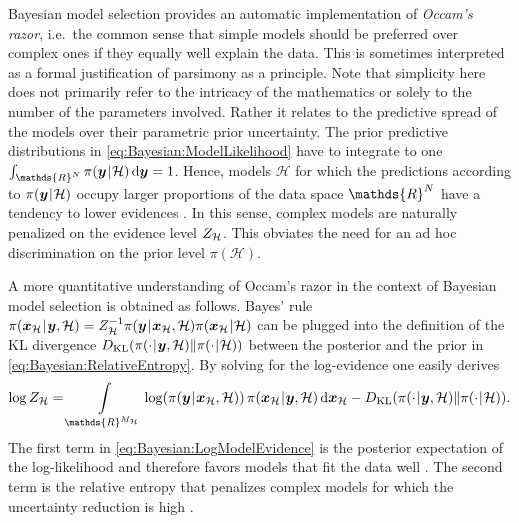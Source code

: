 \par %
Bayesian model selection provides an automatic implementation of \emph{Occam's razor},
i.e.\ the common sense that simple models should be preferred over complex ones if they equally well explain the data.
This is sometimes interpreted as a formal justification of parsimony as a principle.
Note that simplicity here does not primarily refer to the intricacy of the mathematics or solely to the number of the parameters involved.
Rather it relates to the predictive spread of the models over their parametric prior uncertainty.
The prior predictive distributions in \cref{eq:Bayesian:ModelLikelihood} have to integrate to one \(\int_{\mathds{R}^\dimData} \pi(\bm{y} \cond \mathcal{H}) \, \mathrm{d} \bm{y} = 1\).
Hence, models \(\mathcal{H}\) for which the predictions according to \(\pi(\bm{y} {\:\!}|{\:\!} \mathcal{H})\) occupy larger proportions of the data space \(\mathds{R}^\dimData\)
have a tendency to lower evidences \cite{Bayesian:MacKay1992,Bayesian:MacKay1995}.
In this sense, complex models are naturally penalized on the evidence level \(Z_\mathcal{H}\).
This obviates the need for an ad hoc discrimination on the prior level \(\pi(\mathcal{H})\).
\par %
A more quantitative understanding of Occam's razor in the context of Bayesian model selection is obtained as follows.
Bayes' rule \(\pi(\bm{x}_\mathcal{H} {\:\!}|{\:\!} \bm{y},\mathcal{H}) = Z_\mathcal{H}^{-1} \pi(\bm{y} {\:\!}|{\:\!} \bm{x}_\mathcal{H},\mathcal{H}) \pi(\bm{x}_\mathcal{H} {\:\!}|{\:\!} \mathcal{H})\)
can be plugged into the definition of the KL divergence \(D_{\mathrm{KL}}(\pi(\cdot {\:\!}|{\:\!} \bm{y},\mathcal{H}) \| \pi(\cdot {\:\!}|{\:\!} \mathcal{H}))\)
between the posterior and the prior in \cref{eq:Bayesian:RelativeEntropy}.
By solving for the log-evidence one easily derives
\begin{equation} \label{eq:Bayesian:LogModelEvidence}
  \log \scale_\mathcal{H}
  = \int\limits_{\mathds{R}^{\dimParam_\mathcal{H}}} \log(\pi(\bm{y} \cond \bm{x}_\mathcal{H},\mathcal{H}))
  \, \pi(\bm{x}_\mathcal{H} \cond \bm{y},\mathcal{H}) \, \mathrm{d} \bm{x}_\mathcal{H}
  - D_{\mathrm{KL}}(\pi(\cdot \cond \bm{y},\mathcal{H}) \| \pi(\cdot \cond \mathcal{H})).
\end{equation}
The first term in \cref{eq:Bayesian:LogModelEvidence} is the posterior expectation of the log-likelihood
and therefore favors models that fit the data well \cite{Bayesian:Vehtari2012,Bayesian:Gelman2014}.
The second term is the relative entropy that penalizes complex models for which the uncertainty reduction is high \cite{Bayesian:Muto2008,Bayesian:Cheung2010}.
